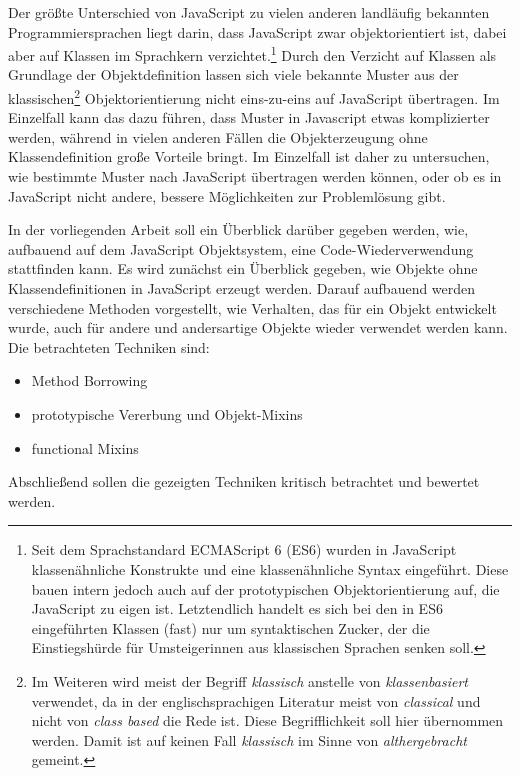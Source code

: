 Der größte Unterschied von JavaScript zu vielen anderen landläufig bekannten Programmiersprachen liegt darin, dass JavaScript zwar objektorientiert ist, dabei aber auf Klassen im Sprachkern verzichtet.\footnote{
Seit dem Sprachstandard ECMAScript 6 (ES6) wurden in JavaScript klassenähnliche Konstrukte und eine klassenähnliche Syntax eingeführt. Diese bauen intern jedoch auch auf der prototypischen Objekt\-orien\-tier\-ung auf, die JavaScript zu eigen ist. Letztendlich handelt es sich bei den in ES6 eingeführten Klassen (fast) nur um syntaktischen Zucker, der die Einstiegshürde für Umsteigerinnen aus klassischen Sprachen senken soll.
}
Durch den Verzicht auf Klassen als Grundlage der Objektdefinition lassen sich viele bekannte Muster aus der klassischen\footnote{
Im Weiteren wird meist der Begriff \emph{klassisch} anstelle von \emph{klassenbasiert} verwendet, da in der englischsprachigen Literatur meist von \emph{classical} und nicht von \emph{class based} die Rede ist. Diese Begrifflichkeit soll hier übernommen werden. Damit ist auf keinen Fall \emph{klassisch} im Sinne von \emph{althergebracht} gemeint. 
} 
Objektorientierung nicht eins-zu-eins auf JavaScript übertragen. Im Einzelfall kann das dazu führen, dass Muster in Javascript etwas komplizierter werden, während in vielen anderen Fällen die Objekterzeugung ohne Klassendefinition große Vorteile bringt. Im Einzelfall ist daher zu untersuchen, wie bestimmte Muster nach JavaScript übertragen werden können, oder ob es in JavaScript nicht andere, bessere Möglichkeiten zur Problemlösung gibt.

\skippingparagraph

In der vorliegenden Arbeit soll ein Überblick darüber gegeben werden, wie, aufbauend auf dem JavaScript Objektsystem, eine Code-Wiederverwendung stattfinden kann. Es wird zunächst ein Überblick gegeben, wie Objekte ohne Klassendefinitionen in JavaScript erzeugt werden. Darauf aufbauend werden verschiedene Methoden vorgestellt, wie Verhalten, das für ein Objekt entwickelt wurde, auch für andere und andersartige Objekte wieder verwendet werden kann. Die betrachteten Techniken sind:
\begin{itemize}
	\item Method Borrowing
	\item prototypische Vererbung und Objekt-Mixins
	\item functional Mixins
\end{itemize}

Abschließend sollen die gezeigten Techniken kritisch betrachtet und bewertet werden.

